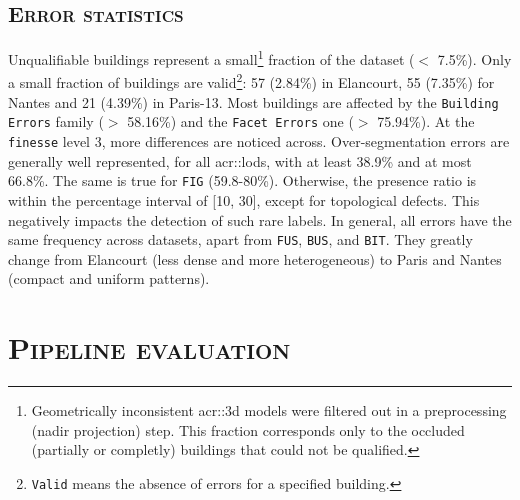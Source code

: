     \subsection{\textsc{Error statistics}}
        \label{subsec::experiments::datasets::stats}
        Unqualifiable buildings represent a small\footnote{
            Geometrically inconsistent \gls{acr::3d} models were filtered out in a preprocessing (nadir projection) step.
            This fraction corresponds only to the occluded (partially or completly) buildings that could not be qualified.
        } fraction of the dataset ($<$ 7.5\%).
        Only a small fraction of buildings are valid\footnote{
            \texttt{Valid} means the absence of errors for a specified building.
        }:
        57 (2.84\%) in Elancourt, 55 (7.35\%) for Nantes and 21 (4.39\%) in Paris-13.
        Most buildings are affected by the \texttt{Building Errors} family ($>$ 58.16\%) and the \texttt{Facet Errors} one ($>$ 75.94\%).
        At the \texttt{finesse} level 3, more differences are noticed across.
        Over-segmentation errors are generally well represented, for all \glspl{acr::lod}, with at least 38.9\% and at most 66.8\%.
        The same is true for \texttt{FIG} (59.8-80\%).
        Otherwise, the presence ratio is within the percentage interval of [10, 30], except for topological defects.
        This negatively impacts the detection of such rare labels.
        In general, all errors have the same frequency across datasets, apart from \texttt{FUS}, \texttt{BUS}, and \texttt{BIT}.
        They greatly change from Elancourt (less dense and more heterogeneous) to Paris and Nantes (compact and uniform patterns).

\section{\textsc{Pipeline evaluation}}
    \label{sec::experiments::evaluation}

